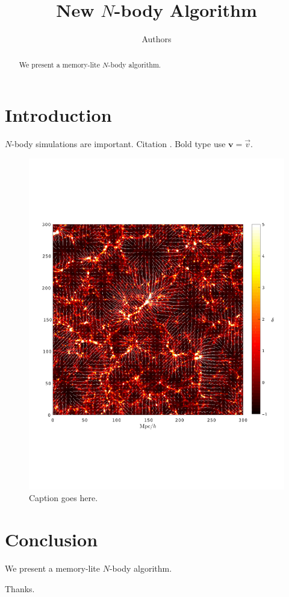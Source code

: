\documentclass[10pt,twocolumn,preprint]{emulateapj}
\newcommand{\bs}{\boldsymbol}
\begin{document}
\title{New $N$-body Algorithm}
\author{Authors}



\begin{abstract}
We present a memory-lite $N$-body algorithm.
\end{abstract}

\keywords{}

\maketitle

\section{Introduction}
$N$-body simulations are important. Citation \cite{2000ApJ...534L..19P}.  Bold type use $\bs{v}=\vec{v}$.


\begin{figure} \centering
  \includegraphics[width=1.0\linewidth]{fig1.pdf}
  \caption{Caption goes here.}
  \label{fig.1}
\end{figure}

\section{Conclusion}
We present a memory-lite $N$-body algorithm.

\acknowledgements
Thanks.



\end{document}
